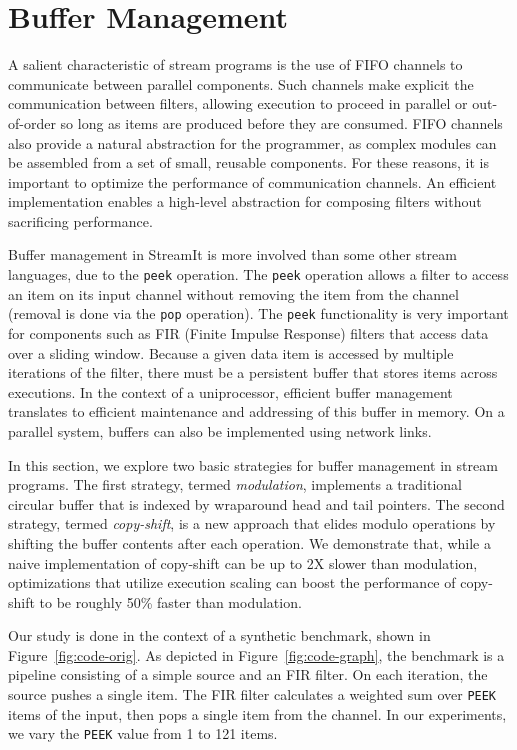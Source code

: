 \section{Buffer Management}
\label{sec:buffer}

A salient characteristic of stream programs is the use of FIFO
channels to communicate between parallel components.  Such channels
make explicit the communication between filters, allowing execution to
proceed in parallel or out-of-order so long as items are produced
before they are consumed.  FIFO channels also provide a natural
abstraction for the programmer, as complex modules can be assembled
from a set of small, reusable components.  For these reasons, it is
important to optimize the performance of communication channels.  An
efficient implementation enables a high-level abstraction for
composing filters without sacrificing performance.

Buffer management in StreamIt is more involved than some other stream
languages, due to the {\tt peek} operation.  The {\tt peek} operation
allows a filter to access an item on its input channel without
removing the item from the channel (removal is done via the {\tt pop}
operation).  The {\tt peek} functionality is very important for
components such as FIR (Finite Impulse Response) filters that access
data over a sliding window.  Because a given data item is accessed by
multiple iterations of the filter, there must be a persistent buffer
that stores items across executions.  In the context of a
uniprocessor, efficient buffer management translates to efficient
maintenance and addressing of this buffer in memory.  On a parallel
system, buffers can also be implemented using network links.



In this section, we explore two basic strategies for buffer management
in stream programs.  The first strategy, termed {\it modulation},
implements a traditional circular buffer that is indexed by wraparound
head and tail pointers.  The second strategy, termed {\it copy-shift},
is a new approach that elides modulo operations by shifting the buffer
contents after each operation.  We demonstrate that, while a naive
implementation of copy-shift can be up to 2X slower than modulation,
optimizations that utilize execution scaling can boost the performance
of copy-shift to be roughly 50\% faster than modulation.

Our study is done in the context of a synthetic benchmark, shown in
Figure~\ref{fig:code-orig}.  As depicted in
Figure~\ref{fig:code-graph}, the benchmark is a pipeline consisting of
a simple source and an FIR filter.  On each iteration, the source
pushes a single item.  The FIR filter calculates a weighted sum over
{\tt PEEK} items of the input, then pops a single item from the
channel.  In our experiments, we vary the {\tt PEEK} value from 1 to
121 items.


